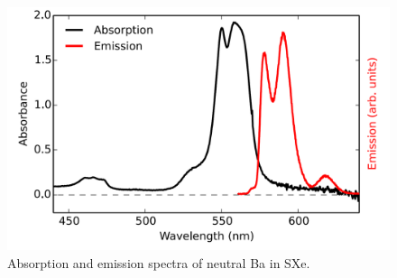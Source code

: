 \begin{figure} %
        \centering
                \includegraphics[width=.7\textwidth]{figures/BaAbs_fromBaSpec.png}
                \caption{Absorption and emission spectra of neutral Ba in SXe.  \cite{Mong2015}}
\label{fig:BaAbs}
\end{figure}

